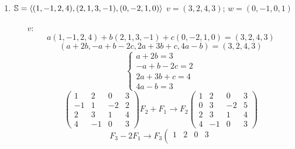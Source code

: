 \documentclass[../practica.root.tex]{subfiles}
\begin{document}
\begin{enumerate}
\begin{enumerate}
              \item $ \S = \langle (1,-1,2,4),(2,1,3,-1),(0,-2,1,0) \rangle $ \tabr $v = (3,2,4,3)$; $w = (0,-1,0,1)$
                    \begin{itemize}
                        \item[$v$: ] \[ a(1,-1,2,4) + b(2,1,3,-1) + c(0,-2,1,0) = (3,2,4,3) \]
                              \[ (a + 2b, -a + b -2c, 2a + 3b + c, 4a - b) = (3,2,4,3) \]
                              \[
                                  \begin{cases}
                                      a + 2b = 3     \\
                                      -a + b -2c = 2 \\
                                      2a + 3b +c = 4 \\
                                      4a - b = 3
                                  \end{cases}
                              \] \[
                                  \left(
                                  \begin{array}{ccc|c}
                                          1  & 2  & 0  & 3 \\
                                          -1 & 1  & -2 & 2 \\
                                          2  & 3  & 1  & 4 \\
                                          4  & -1 & 0  & 3
                                      \end{array}
                                  \right)
                                  F_2 + F_1 \to F_2
                                  \left(
                                  \begin{array}{ccc|c}
                                          1 & 2  & 0  & 3 \\
                                          0 & 3  & -2 & 5 \\
                                          2 & 3  & 1  & 4 \\
                                          4 & -1 & 0  & 3
                                      \end{array}
                                  \right)
                              \] \[
                                  F_3 - 2F_1 \to F_3
                                  \left(
                                  \begin{array}{ccc|c}
                                          1 & 2  & 0  & 3  \\

\end{array}\]
\end{itemize}
\end{enumerate}
\end{enumerate}
\end{document}
